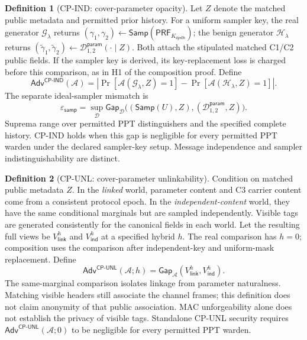 \documentclass[pdflatex,sn-mathphys-num]{sn-jnl}%
\theoremstyle{definition}
\newtheorem{definition}{Definition}[section]
\theoremstyle{game}
\theoremstyle{thmstyleone}%
\theoremstyle{thmstyletwo}%
\theoremstyle{thmstylethree}%
\begin{document}
\begin{definition}[CP-IND: cover-parameter opacity]
\label{def:cp-opacity}\label{def:cp-ind}
Let $Z$ denote the matched public metadata and permitted prior history.
For a uniform sampler key, the real generator $\mathcal G_\lambda$ returns
$(\gamma_1,\gamma_2)\leftarrow\mathsf{Samp}(\mathsf{PRF}_{K_{\mathsf{synth}}})$;
the benign generator $\mathcal H_\lambda$ returns
$(\widetilde\gamma_1,\widetilde\gamma_2)\leftarrow
\mathcal D^{\mathsf{param}}_{1,2}(\cdot\mid Z)$.
Both attach the stipulated matched C1/C2 public fields. If the sampler
key is derived, its key-replacement loss is charged before this comparison,
as in H1 of the composition proof. Define
\[
\mathsf{Adv}^{\mathsf{CP\text{-}IND}}(\mathcal A)
=\left|\Pr[\mathcal A(\mathcal G_\lambda,Z)=1]
-\Pr[\mathcal A(\mathcal H_\lambda,Z)=1]\right|.
\]
The separate ideal-sampler mismatch is
\begin{equation}\label{eq:sampler-loss}
\varepsilon_{\mathsf{samp}}
=\sup_{\mathcal D}\mathsf{Gap}_{\mathcal D}
\bigl((\mathsf{Samp}(U),Z),(\mathcal D^{\mathsf{param}}_{1,2},Z)\bigr).
\end{equation}
Suprema range over permitted PPT distinguishers and the specified complete
history. CP-IND holds when this gap is negligible for every permitted PPT
warden under the declared sampler-key setup. Message independence and
sampler indistinguishability are distinct.
\end{definition}

\begin{definition}[CP-UNL: cover-parameter unlinkability]\label{def:cp_unl}
Condition on matched public metadata $Z$. In the \emph{linked} world,
parameter content and C3 carrier content come from a consistent protocol
epoch. In the \emph{independent-content} world, they have the same conditional
marginals but are sampled independently. Visible tags are generated
consistently for the canonical fields in each world. Let the resulting full
views be $V^h_{\mathsf{link}}$ and $V^h_{\mathsf{ind}}$ at a specified
hybrid $h$. The real comparison has $h=0$; composition uses the comparison
after independent-key and uniform-mask replacement. Define
\[
\mathsf{Adv}^{\mathsf{CP\text{-}UNL}}(\mathcal A;h)
=\mathsf{Gap}_{\mathcal A}(V^h_{\mathsf{link}},V^h_{\mathsf{ind}}).
\]
The same-marginal comparison isolates linkage from parameter naturalness.
Matching visible headers still associate the channel frames; this definition
does not claim anonymity of that public association. MAC unforgeability
alone does not establish the privacy of visible tags. Standalone CP-UNL
security requires $\mathsf{Adv}^{\mathsf{CP\text{-}UNL}}(\mathcal A;0)$
to be negligible for every permitted PPT warden.
\end{definition}
\end{document}
